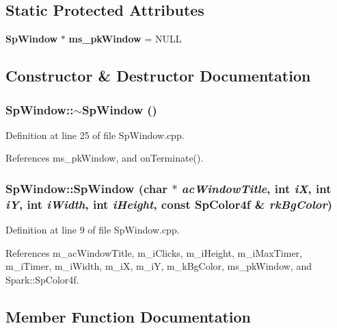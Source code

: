 \subsection*{Static Protected Attributes}
\begin{CompactItemize}
\item 
{\bf Sp\-Window} $\ast$ {\bf ms\_\-pk\-Window} = NULL
\end{CompactItemize}


\subsection{Constructor \& Destructor Documentation}
\subsubsection{\setlength{\rightskip}{0pt plus 5cm}Sp\-Window::$\sim${\bf Sp\-Window} ()\hspace{0.3cm}{\tt  [virtual]}}\label{classSpark_1_1SpWindow_a0}


Definition at line 25 of file Sp\-Window.cpp.

References ms\_\-pk\-Window, and on\-Terminate().
\subsubsection{\setlength{\rightskip}{0pt plus 5cm}Sp\-Window::Sp\-Window (char $\ast$ {\em ac\-Window\-Title}, int {\em i\-X}, int {\em i\-Y}, int {\em i\-Width}, int {\em i\-Height}, const {\bf Sp\-Color4f} \& {\em rk\-Bg\-Color})\hspace{0.3cm}{\tt  [protected]}}\label{classSpark_1_1SpWindow_b0}


Definition at line 9 of file Sp\-Window.cpp.

References m\_\-ac\-Window\-Title, m\_\-i\-Clicks, m\_\-i\-Height, m\_\-i\-Max\-Timer, m\_\-i\-Timer, m\_\-i\-Width, m\_\-i\-X, m\_\-i\-Y, m\_\-k\-Bg\-Color, ms\_\-pk\-Window, and Spark::Sp\-Color4f.

\subsection{Member Function Documentation}
